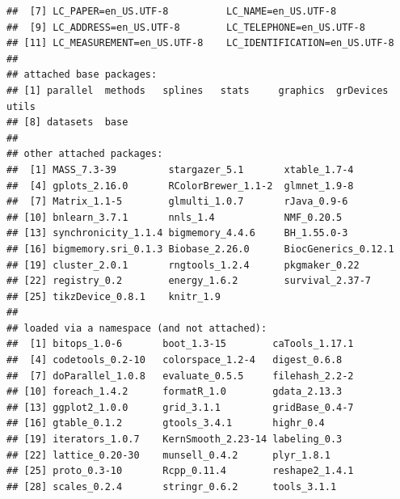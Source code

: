 \documentclass{article}\usepackage[]{graphicx}\usepackage[]{color}
\makeatletter
\newenvironment{kframe}{%
 \def\at@end@of@kframe{}%
 \ifinner\ifhmode%
  \def\at@end@of@kframe{\end{minipage}}%
  \begin{minipage}{\columnwidth}%
 \fi\fi%
 \def\FrameCommand##1{\hskip\@totalleftmargin \hskip-\fboxsep
 \colorbox{shadecolor}{##1}\hskip-\fboxsep
     \hskip-\linewidth \hskip-\@totalleftmargin \hskip\columnwidth}%
 \MakeFramed {\advance\hsize-\width
   \@totalleftmargin\z@ \linewidth\hsize
   \@setminipage}}%
 {\par\unskip\endMakeFramed%
 \at@end@of@kframe}
\newenvironment{knitrout}{}{} %
\makeatother
\begin{document}
\begin{knitrout}
\begin{kframe}
\begin{verbatim}
##  [7] LC_PAPER=en_US.UTF-8          LC_NAME=en_US.UTF-8          
##  [9] LC_ADDRESS=en_US.UTF-8        LC_TELEPHONE=en_US.UTF-8     
## [11] LC_MEASUREMENT=en_US.UTF-8    LC_IDENTIFICATION=en_US.UTF-8
## 
## attached base packages:
## [1] parallel  methods   splines   stats     graphics  grDevices utils    
## [8] datasets  base     
## 
## other attached packages:
##  [1] MASS_7.3-39         stargazer_5.1       xtable_1.7-4       
##  [4] gplots_2.16.0       RColorBrewer_1.1-2  glmnet_1.9-8       
##  [7] Matrix_1.1-5        glmulti_1.0.7       rJava_0.9-6        
## [10] bnlearn_3.7.1       nnls_1.4            NMF_0.20.5         
## [13] synchronicity_1.1.4 bigmemory_4.4.6     BH_1.55.0-3        
## [16] bigmemory.sri_0.1.3 Biobase_2.26.0      BiocGenerics_0.12.1
## [19] cluster_2.0.1       rngtools_1.2.4      pkgmaker_0.22      
## [22] registry_0.2        energy_1.6.2        survival_2.37-7    
## [25] tikzDevice_0.8.1    knitr_1.9          
## 
## loaded via a namespace (and not attached):
##  [1] bitops_1.0-6       boot_1.3-15        caTools_1.17.1    
##  [4] codetools_0.2-10   colorspace_1.2-4   digest_0.6.8      
##  [7] doParallel_1.0.8   evaluate_0.5.5     filehash_2.2-2    
## [10] foreach_1.4.2      formatR_1.0        gdata_2.13.3      
## [13] ggplot2_1.0.0      grid_3.1.1         gridBase_0.4-7    
## [16] gtable_0.1.2       gtools_3.4.1       highr_0.4         
## [19] iterators_1.0.7    KernSmooth_2.23-14 labeling_0.3      
## [22] lattice_0.20-30    munsell_0.4.2      plyr_1.8.1        
## [25] proto_0.3-10       Rcpp_0.11.4        reshape2_1.4.1    
## [28] scales_0.2.4       stringr_0.6.2      tools_3.1.1
\end{verbatim}
\end{kframe}
\end{knitrout}
\end{document}
